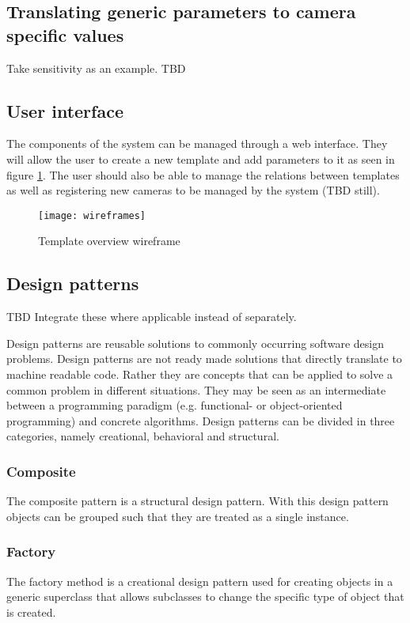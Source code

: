 \subsection{Translating generic parameters to camera specific values}
Take sensitivity as an example. TBD

\subsection{User interface}
The components of the system can be managed through a web interface.
They will allow the user to create a new template and add parameters to it as seen in figure \ref{fig:templatewireframe}.
The user should also be able to manage the relations between templates as well as registering new cameras to be managed by the system (TBD still).
\begin{figure}[h!]
	\centering
	\texttt{[image: wireframes]}
	\caption{Template overview  wireframe}
	\label{fig:templatewireframe}
\end{figure}

\subsection{Design patterns}
TBD Integrate these where applicable instead of separately.

Design patterns are reusable solutions to commonly occurring software design problems. Design patterns are not ready made solutions that directly translate to machine readable code. Rather they are concepts that can be applied to solve a common problem in different situations. They may be seen as an intermediate between a programming paradigm (e.g. functional- or object-oriented programming) and
concrete algorithms. Design patterns can be divided in three categories, namely creational, behavioral and structural.

\subsubsection{Composite}
The composite pattern is a structural design pattern. With this design pattern objects can be grouped such that they are treated as a
single instance.

\subsubsection{Factory}
The factory method is a creational design pattern used for creating objects in a generic superclass that allows subclasses to change the
specific type of object that is created.
